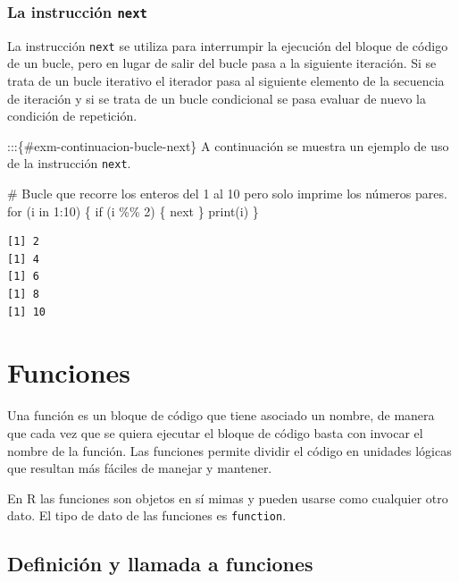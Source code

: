 \documentclass[
  a4paper,
]{scrreport}
\newenvironment{Shaded}{\begin{snugshade}}{\end{snugshade}}
\newcommand{\CommentTok}[1]{\textcolor[rgb]{0.37,0.37,0.37}{#1}}
\newcommand{\ControlFlowTok}[1]{\textcolor[rgb]{0.00,0.23,0.31}{#1}}
\newcommand{\DecValTok}[1]{\textcolor[rgb]{0.68,0.00,0.00}{#1}}
\newcommand{\FunctionTok}[1]{\textcolor[rgb]{0.28,0.35,0.67}{#1}}
\newcommand{\NormalTok}[1]{\textcolor[rgb]{0.00,0.23,0.31}{#1}}
\newcommand{\SpecialCharTok}[1]{\textcolor[rgb]{0.37,0.37,0.37}{#1}}
\theoremstyle{definition}
\theoremstyle{definition}
\theoremstyle{remark}
\begin{document}
\hypertarget{la-instrucciuxf3n-next}{%
\subsection{\texorpdfstring{La instrucción
\texttt{next}}{La instrucción next}}\label{la-instrucciuxf3n-next}}

La instrucción \texttt{next} se utiliza para interrumpir la ejecución
del bloque de código de un bucle, pero en lugar de salir del bucle pasa
a la siguiente iteración. Si se trata de un bucle iterativo el iterador
pasa al siguiente elemento de la secuencia de iteración y si se trata de
un bucle condicional se pasa evaluar de nuevo la condición de
repetición.

:::\{\#exm-continuacion-bucle-next\} A continuación se muestra un
ejemplo de uso de la instrucción \texttt{next}.

\begin{Shaded}
\begin{Highlighting}[]
\CommentTok{\# Bucle que recorre los enteros del 1 al 10 pero solo imprime los números pares.}
\ControlFlowTok{for}\NormalTok{ (i }\ControlFlowTok{in} \DecValTok{1}\SpecialCharTok{:}\DecValTok{10}\NormalTok{) \{}
  \ControlFlowTok{if}\NormalTok{ (i }\SpecialCharTok{\%\%} \DecValTok{2}\NormalTok{) \{}
    \ControlFlowTok{next}
\NormalTok{  \}}
  \FunctionTok{print}\NormalTok{(i)}
\NormalTok{\}}
\end{Highlighting}
\end{Shaded}

\begin{verbatim}
[1] 2
[1] 4
[1] 6
[1] 8
[1] 10
\end{verbatim}


\hypertarget{funciones}{%
\chapter{Funciones}\label{funciones}}

Una función es un bloque de código que tiene asociado un nombre, de
manera que cada vez que se quiera ejecutar el bloque de código basta con
invocar el nombre de la función. Las funciones permite dividir el código
en unidades lógicas que resultan más fáciles de manejar y mantener.

En R las funciones son objetos en sí mimas y pueden usarse como
cualquier otro dato. El tipo de dato de las funciones es
\texttt{function}.

\hypertarget{definiciuxf3n-y-llamada-a-funciones}{%
\section{Definición y llamada a
funciones}\label{definiciuxf3n-y-llamada-a-funciones}}
\end{document}
